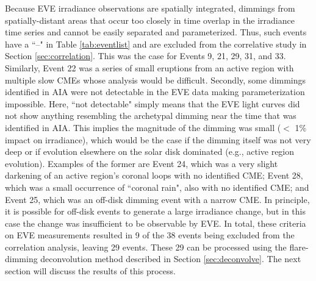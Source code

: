 Because EVE irradiance observations are spatially integrated, dimmings from spatially-distant areas that occur too closely in time overlap in the irradiance time series and cannot be easily separated and parameterized. Thus, such events have a ``--" in Table \ref{tab:eventlist} and are excluded from the correlative study in Section \ref{sec:correlation}. This was the case for Events 9, 21, 29, 31, and 33. Similarly, Event 22 was a series of small eruptions from an active region with multiple slow CMEs whose analysis would be difficult. Secondly, some dimmings identified in AIA were not detectable in the EVE data making parameterization impossible. Here, ``not detectable" simply means that the EVE light curves did not show anything resembling the archetypal dimming near the time that was identified in AIA. This implies the magnitude of the dimming was small ($<$ 1\% impact on irradiance), which would be the case if the dimming itself was not very deep or if evolution elsewhere on the solar disk dominated (e.g., active region evolution). Examples of the former are Event 24, which was a very slight darkening of an active region’s coronal loops with no identified CME; Event 28, which was a small occurrence of ``coronal rain", also with no identified CME; and Event 25, which was an off-disk dimming event with a narrow CME. In principle, it is possible for off-disk events to generate a large irradiance change, but in this case the change was insufficient to be observable by EVE. In total, these criteria on EVE measurements resulted in 9 of the 38 events being excluded from the correlation analysis, leaving 29 events. These 29 can be processed using the flare-dimming deconvolution method described in Section \ref{sec:deconvolve}. The next section will discuss the results of this process. 

